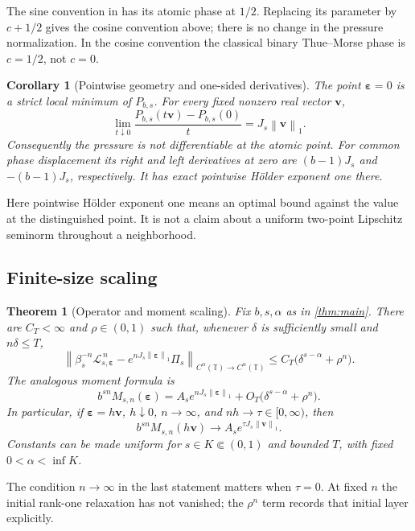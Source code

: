\documentclass[11pt,a4paper]{article}
\numberwithin{equation}{section}
\newtheorem{theorem}{Theorem}[section]
\newtheorem{corollary}[corollary]{Corollary}
\theoremstyle{definition}
\theoremstyle{remark}
\newcommand{\TT}{\mathbb T}
\newcommand{\Lop}{\mathcal L}
\newcommand{\norm}[1]{\left\lVert#1\right\rVert}
\newcommand{\eps}{\boldsymbol\varepsilon}
\newcommand{\vel}{\boldsymbol v}
\newcommand{\Proj}{\Pi}
\newcommand{\Holder}{C^\alpha(\TT)}
\begin{document}
The sine convention in \cite{GLS} has its atomic phase at $1/2$.
Replacing its parameter by $c+1/2$ gives the cosine convention above;
there is no change in the pressure normalization. In the cosine
convention the classical binary Thue--Morse phase is $c=1/2$, not $c=0$.

\begin{corollary}[Pointwise geometry and one-sided derivatives]
\label{cor:geometry}
The point $\eps=0$ is a strict local minimum of $P_{b,s}$. For every
fixed nonzero real vector $\vel$,
\begin{equation}
 \lim_{t\downarrow0}\frac{P_{b,s}(t\vel)-P_{b,s}(0)}{t}
 =J_s\norm\vel_1.
 \label{eq:direction}
\end{equation}
Consequently the pressure is not differentiable at the atomic point.
For common phase displacement its right and left derivatives at zero
are $(b-1)J_s$ and $-(b-1)J_s$, respectively. It has exact pointwise
H\"older exponent one there.
\end{corollary}
Here pointwise H\"older exponent one means an optimal bound against the
value at the distinguished point. It is not a claim about a uniform
two-point Lipschitz seminorm throughout a neighborhood.

\subsection{Finite-size scaling}
\begin{theorem}[Operator and moment scaling]
\label{thm:finite}
Fix $b,s,\alpha$ as in \cref{thm:main}. There are $C_T<\infty$ and
$\rho\in(0,1)$ such that, whenever $\delta$ is sufficiently small and
$n\delta\leq T$,
\begin{equation}
 \left\|\beta_s^{-n}\Lop_{s,\eps}^{\,n}
       -e^{nJ_s\norm\eps_1}\Proj_s\right\|_{\Holder\to\Holder}
 \leq C_T\bigl(\delta^{s-\alpha}+\rho^n\bigr).
 \label{eq:finite-operator}
\end{equation}
The analogous moment formula is
\begin{equation}
 b^{sn}M_{s,n}(\eps)
   =A_s e^{nJ_s\norm\eps_1}
      +O_T\bigl(\delta^{s-\alpha}+\rho^n\bigr).
 \label{eq:finite-moment}
\end{equation}
In particular, if $\eps=h\vel$, $h\downarrow0$, $n\to\infty$, and
$nh\to\tau\in[0,\infty)$, then
\begin{equation}
 b^{sn}M_{s,n}(h\vel)\longrightarrow
 A_s e^{\tau J_s\norm\vel_1}.
 \label{eq:finite-limit}
\end{equation}
Constants can be made uniform for $s\in K\Subset(0,1)$ and bounded
$T$, with fixed $0<\alpha<\inf K$.
\end{theorem}
The condition $n\to\infty$ in the last statement matters when
$\tau=0$. At fixed $n$ the initial rank-one relaxation has not vanished;
the $\rho^n$ term records that initial layer explicitly.
\end{document}
